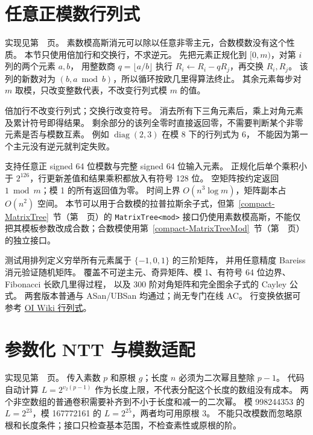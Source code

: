 \section{任意正模数行列式}\label{knowledge-det-mod}
实现见第~\pageref{compact-determinant_mod}~页。
素数模高斯消元可以除以任意非零主元，合数模数没有这个性质。
本节只使用倍加行和交换行，不求逆元。
先把元素正规化到 $[0,m)$，对第 $i$ 列的两个元素 $a,b$，
用整数商 $q=\lfloor a/b\rfloor$ 执行
$R_i\leftarrow R_i-qR_j$，再交换 $R_i,R_j$。
该列的新数对为 $(b,a\bmod b)$，所以循环按欧几里得算法终止。
其余元素每步对 $m$ 取模，只改变整数代表，不改变行列式模 $m$ 的值。

倍加行不改变行列式；交换行改变符号。
消去所有下三角元素后，乘上对角元素及累计符号即得结果。
剩余部分的该列全零时直接返回零，不需要判断某个非零元素是否与模数互素。
例如 $\operatorname{diag}(2,3)$ 在模 8 下的行列式为 6，
不能因为第一个主元没有逆元就判定失败。

支持任意正 signed 64 位模数与完整 signed 64 位输入元素。
正规化后单个乘积小于 $2^{126}$，行更新差值和结果乘积都放入有符号 128 位。
空矩阵按约定返回 $1\bmod m$；模 1 的所有返回值为零。
时间上界 $O(n^3\log m)$，矩阵副本占 $O(n^2)$ 空间。
本节可以用于合数模的拉普拉斯余子式，但第~\ref{compact-MatrixTree}~节（第~\pageref{compact-MatrixTree}~页）的 \texttt{MatrixTree<mod>}
接口仍使用素数模高斯，不能仅把其模板参数改成合数；合数模使用第~\ref{compact-MatrixTreeMod}~节（第~\pageref{compact-MatrixTreeMod}~页）的独立接口。

测试用排列定义穷举所有元素属于 $\{-1,0,1\}$ 的三阶矩阵，
并用任意精度 Bareiss 消元验证随机矩阵。
覆盖不可逆主元、奇异矩阵、模 1、有符号 64 位边界、Fibonacci 长欧几里得过程，
以及 300 阶对角矩阵和完全图余子式的 Cayley 公式。
两套版本普通与 ASan/UBSan 均通过；尚无专门在线 AC。
行变换依据可参考 \href{https://oi-wiki.org/math/linear-algebra/determinant/}{OI Wiki 行列式}。

\clearpage
\section{参数化 NTT 与模数适配}\label{knowledge-ntt-moduli}
实现见第~\pageref{compact-NttConvolution}~页。
传入素数 $p$ 和原根 $g$；长度 $n$ 必须为二次幂且整除 $p-1$。
代码自动计算 $L=2^{v_2(p-1)}$ 作为长度上限，不代表分配这个长度的数组没有成本。
两个非空数组的普通卷积需要补齐到不小于长度和减一的二次幂。
模 998244353 的 $L=2^{23}$，模 167772161 的 $L=2^{25}$，两者均可用原根 3。
不能只改模数而忽略原根和长度条件；接口只检查基本范围，不检查素性或原根的阶。

